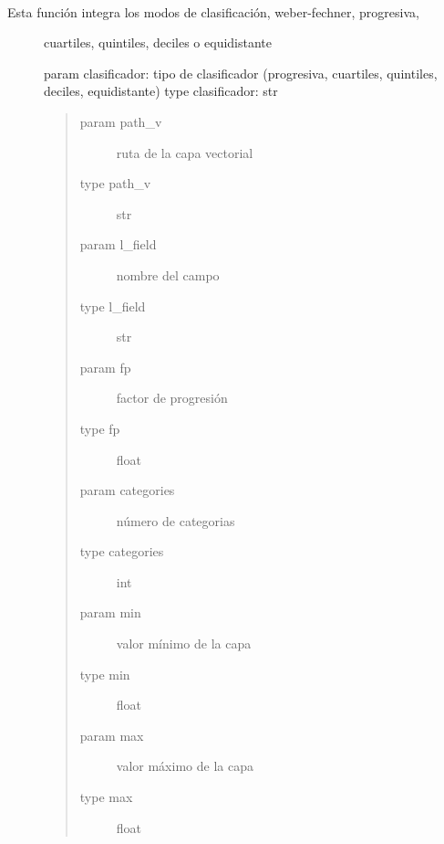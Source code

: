 \documentclass[letterpaper,10pt,spanish]{sphinxmanual}
\begin{document}

\begin{fulllineitems}
\label{\detokenize{apcsig:apcsig.tipo_clasificador_s}}~\begin{description}
\item[{Esta función integra los modos de clasificación, weber-fechner, progresiva,}] \leavevmode
cuartiles, quintiles, deciles o equidistante

param clasificador: tipo de clasificador (progresiva, cuartiles, quintiles, deciles, equidistante)
type clasificador: str
\begin{quote}\begin{description}
\item[{param path\_v}] \leavevmode
ruta de la capa vectorial

\item[{type path\_v}] \leavevmode
str

\item[{param l\_field}] \leavevmode
nombre del campo

\item[{type l\_field}] \leavevmode
str

\item[{param fp}] \leavevmode
factor de progresión

\item[{type fp}] \leavevmode
float

\item[{param categories}] \leavevmode
número de categorias

\item[{type categories}] \leavevmode
int

\item[{param min}] \leavevmode
valor mínimo de la capa

\item[{type min}] \leavevmode
float

\item[{param max}] \leavevmode
valor máximo de la capa

\item[{type max}] \leavevmode
float

\end{description}\end{quote}

\end{description}

\end{fulllineitems}
\end{document}
